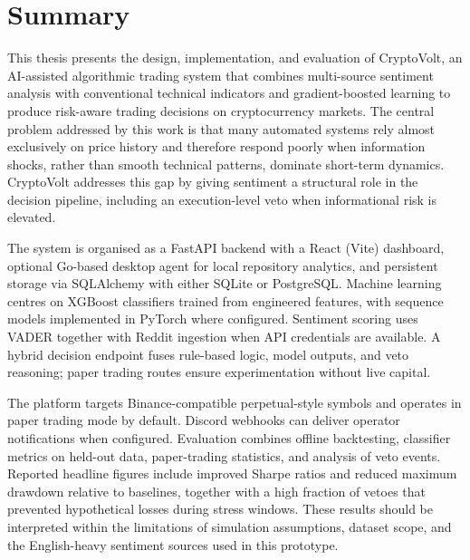 \chapter*{Summary}

This thesis presents the design, implementation, and evaluation of CryptoVolt, an AI-assisted algorithmic trading system that combines multi-source sentiment analysis with conventional technical indicators and gradient-boosted learning to produce risk-aware trading decisions on cryptocurrency markets. The central problem addressed by this work is that many automated systems rely almost exclusively on price history and therefore respond poorly when information shocks, rather than smooth technical patterns, dominate short-term dynamics. CryptoVolt addresses this gap by giving sentiment a structural role in the decision pipeline, including an execution-level veto when informational risk is elevated.

The system is organised as a FastAPI backend with a React (Vite) dashboard, optional Go-based desktop agent for local repository analytics, and persistent storage via SQLAlchemy with either SQLite or PostgreSQL. Machine learning centres on XGBoost classifiers trained from engineered features, with sequence models implemented in PyTorch where configured. Sentiment scoring uses VADER together with Reddit ingestion when API credentials are available. A hybrid decision endpoint fuses rule-based logic, model outputs, and veto reasoning; paper trading routes ensure experimentation without live capital.

The platform targets Binance-compatible perpetual-style symbols and operates in paper trading mode by default. Discord webhooks can deliver operator notifications when configured. Evaluation combines offline backtesting, classifier metrics on held-out data, paper-trading statistics, and analysis of veto events. Reported headline figures include improved Sharpe ratios and reduced maximum drawdown relative to baselines, together with a high fraction of vetoes that prevented hypothetical losses during stress windows. These results should be interpreted within the limitations of simulation assumptions, dataset scope, and the English-heavy sentiment sources used in this prototype.

